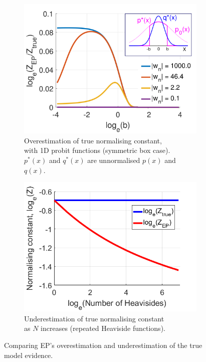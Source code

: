 \documentclass{article}
\begin{document}
\begin{figure}[h]
\centering
\begin{subfigure}{.5\textwidth}
  \centering
  \includegraphics[height=.7\linewidth]{Overestimation_probit_plot.png}
  \caption{Overestimation of true normalising constant,\\ with 1D probit functions (symmetric box case). \\ $p^*(x)$ and $q^*(x)$ are unnormalised $p(x)$ and $q(x)$.}
  \label{fig:Overestimation probit plot}
\end{subfigure}%
\begin{subfigure}{.5\textwidth}
  \centering
  \includegraphics[height=.7\linewidth]{Underestimation_plot.png}
  \caption{Underestimation of true normalising constant\\ as $N$ increases (repeated Heaviside functions).}
  \label{fig:Underestimation probit plot}
\end{subfigure}
\caption{Comparing EP's overestimation and underestimation of the true model evidence.}
\label{fig:Model evidence plots}
\end{figure}
%
\end{document}
